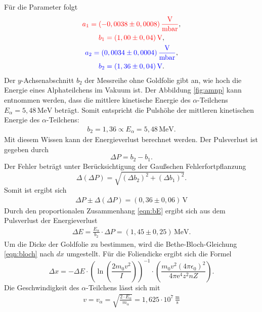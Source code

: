 Für die Parameter folgt
\begin{gather*}
  \textcolor{red}{a_1 = (-0,0038 \pm 0,0008)\,\frac{\text{V}}{\text{mbar}}}, \\
  \textcolor{red}{b_1 = (1,00 \pm 0,04)\,\text{V}}, \\
  \textcolor{blue}{a_2 = (0,0034 \pm 0,0004)\,\frac{\text{V}}{\text{mbar}}}, \\
  \textcolor{blue}{b_2 = (1,36 \pm 0,04)\,\text{V}}.
\end{gather*}
Der $y$-Achsenabschnitt $b_2$ der Messreihe ohne Goldfolie gibt an,
wie hoch die Energie eines Alphateilchens im Vakuum ist.
Der Abbildung \ref{fig:amnp} kann entnommen werden,
dass die mittlere kinetische Energie des $\alpha$-Teilchens $E_{\alpha} = 5,48\,\text{MeV}$ beträgt.
Somit entspricht die Pulshöhe der mittleren kinetischen Energie des $\alpha$-Teilchens:
\begin{align}
  b_2 = 1,36 \propto E_{\alpha} = 5,48\,\text{MeV}.
  \label{eqn:bE}
\end{align}
Mit diesem Wissen kann der Energieverlust berechnet werden.
Der Pulsverlust ist gegeben durch
\begin{equation}
  \Delta{P} = b_2-b_1.
\end{equation}
Der Fehler beträgt unter Berücksichtigung der Gaußschen Fehlerfortpflanzung
\begin{equation}
  \Delta(\Delta{P}) = \sqrt{(\Delta{b_2})^2 + (\Delta{b_1})^2}.
\end{equation}
Somit ist ergibt sich
\begin{align*}
  \Delta{P}\pm\Delta(\Delta{P}) = (0,36\pm0,06)\,\text{V}
\end{align*}
Durch den proportionalen Zusammenhang \eqref{eqn:bE} ergibt sich aus dem Pulsverlust der Energieverlust
\begin{align*}
  \Delta{E} = \frac{E_{\alpha}}{b_2}\cdot{\Delta{P}} = (1,45\pm0,25)\,\text{MeV}.
\end{align*}
Um die Dicke der Goldfolie zu bestimmen, wird die Bethe-Bloch-Gleichung \eqref{eqn:bloch} nach $dx$ umgestellt.
Für die Foliendicke ergibt sich die Formel
\begin{equation}
  \Delta{x} = -\Delta{E}\cdot\left( \ln\left( \frac{2m_0v^2}{I} \right) \right)^{-1}\cdot\left(\frac{m_0v^2(4\pi\epsilon_0)^2}{4\pi\text{e}^4z^2nZ}\right).
\end{equation}
Die Geschwindigkeit des $\alpha$-Teilchens lässt sich mit
\begin{align*}
  v = v_{\alpha} = \sqrt{ \frac{2\cdot{E_{\alpha}}}{m_{\alpha}} } = 1,625\cdot10^{7}\,\frac{\text{m}}{\text{s}}
\end{align*}
